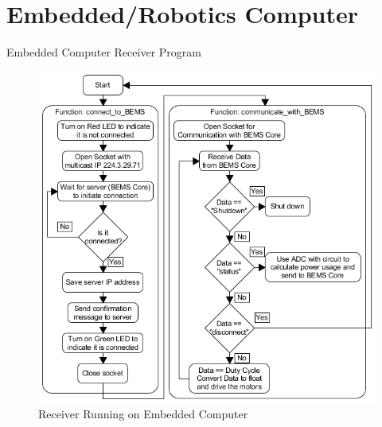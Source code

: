 \documentclass{beamer}
\begin{document}
\section{Embedded/Robotics Computer}
\begin{frame}{Embedded Computer Receiver Program}{}
    \begin{figure}
        \centering
        \includegraphics[scale=0.45]{figs/Beaglebone_Receiver_Diagram.png}
        \caption{Receiver Running on Embedded Computer}
        \label{fig:Beaglebone_Receiver_Diagram}
    \end{figure}
\end{frame}
\end{document}
